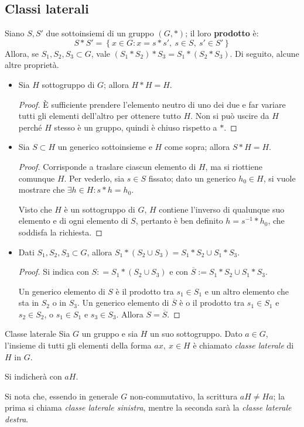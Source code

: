 \documentclass[11pt, a4paper]{scrartcl}
\theoremstyle{definition}
\numberwithin{esempio}{section}
\theoremstyle{definition}
\numberwithin{obs}{section}
\numberwithin{nota}{section}
\numberwithin{equation}{subsection}
\begin{document}
\subsection{Classi laterali}\label{cosets}
Siano $S,S'$ due sottoinsiemi di un gruppo $(G,*)$; il loro \textbf{prodotto} \`e:
\begin{equation*}
	S * S' = \left\{ x \in G : x = s * s', \ s \in S,\ s' \in S' \right\} 
\end{equation*}
Allora, se $S_1,S_2,S_3 \subset G$, vale $(S_1 * S_2) * S_3 = S_1 * (S_2 * S_3)$.
Di seguito, alcune altre propriet\`a.
\begin{itemize}
	\item Sia $H$ sottogruppo di $G$; allora $H * H = H$.
		\begin{proof}
			\`E sufficiente prendere l'elemento neutro di uno dei due e far variare tutti gli elementi dell'altro per ottenere tutto $H$. 
			Non si pu\`o uscire da $H$ perch\'e $H$ stesso \`e un gruppo, quindi \`e chiuso rispetto a $*$.
		\end{proof}
	\item Sia $S \subset H$ un generico sottoinsieme e $H$ come sopra; allora $S * H = H$.
		\begin{proof}
			Corrisponde a traslare ciascun elemento di $H$, ma si riottiene comunque $H$. 
			Per vederlo, sia $s \in S$ fissato; dato un generico $h_0 \in H$, si vuole mostrare che $\exists h \in H : s*h= h_0$.

			Visto che $H$ \`e un sottogruppo di $G$, $H$ contiene l'inverso di qualunque suo elemento e di ogni elemento di $S$, pertanto \`e ben definito $h = s^{-1} * h_0$, che soddisfa la richiesta.
		\end{proof}
	\item Dati $S_1,S_2,S_3 \subset G$, allora $S_1 * (S_2 \cup S_3) = S_1*S_2 \cup S_1 * S_3$.
		\begin{proof}
			Si indica con $S: = S_1 * (S_2 \cup S_3)$ e con $\overline{S}:= S_1 * S_2 \cup S_1 * S_3$.

			Un generico elemento di $S$ \`e il prodotto tra $s_1 \in S_1$ e un altro elemento che sta in $S_2$ o in $S_3$.
			Un generico elemento di $\overline{S}$ \`e o il prodotto tra $s_1 \in S_1$ e $s_2 \in  S_2$, o $s_1 \in S_1$ e $s_3 \in S_3$. Allora $S = \overline{S}$.
		\end{proof}
\end{itemize}
\begin{definizione}
	{Classe laterale}{}
	Sia $G$ un gruppo e sia $H$ un suo sottogruppo. Dato $a \in G$, l'insieme di tutti gli elementi della forma $ax, \ x \in H$ \`e chiamato \textit{classe laterale} di $H$ in $G$.

	Si indicher\`a con $aH$.
\end{definizione}
Si nota che, essendo in generale $G$ non-commutativo, la scrittura $aH \neq Ha$; la prima si chiama \textit{classe laterale sinistra}, mentre la seconda sar\`a la \textit{classe laterale destra}.
\end{document}
